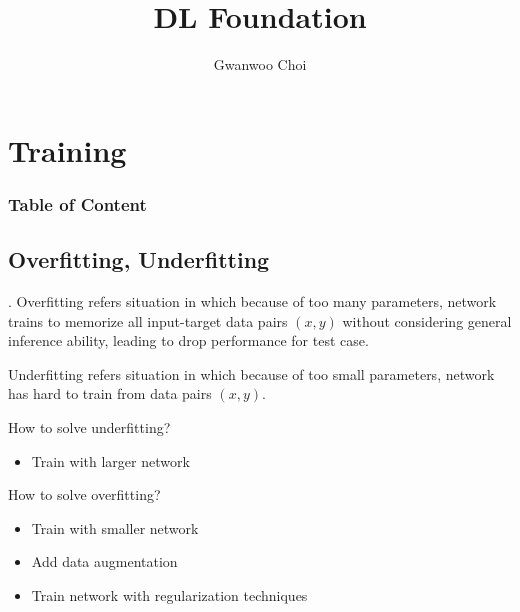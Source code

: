 \documentclass[8pt]{beamer}
\title{DL Foundation}
\author{Gwanwoo Choi}
\begin{document}
\begin{frame}
    \titlepage
\end{frame}

\section{Training}
\begingroup
    \begin{frame}
        \begin{multicols}{2}
            \frametitle{Table of Content}
            \tableofcontents
        \end{multicols}
    \end{frame}
\endgroup
\subsection{Overfitting, Underfitting}
\begin{frame}{.}
    Overfitting refers situation in which because of too many parameters, network trains to memorize all input-target data pairs $(x,y)$ without considering general inference ability, leading to drop performance for test case.

    Underfitting refers situation in which because of too small parameters, network has hard to train from data pairs $(x,y)$.


    \begin{block}{How to solve underfitting?}
        \begin{itemize}
            \item Train with larger network
        \end{itemize}
    \end{block}

    \begin{block}{How to solve overfitting?}
        \begin{itemize}
            \item Train with smaller network
            \item Add data augmentation
            \item Train network with regularization techniques
        \end{itemize}
    \end{block}
\end{frame}
\end{document}
